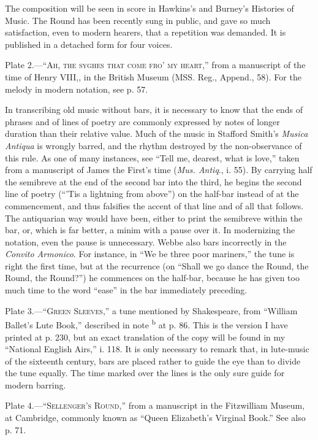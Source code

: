 The composition will be seen in score in Hawkins’s and Burney’s Histories of
Music. The Round has been recently sung in public, and gave so much satisfaction,
even to modern hearers, that a repetition was demanded. It is published in a detached
form for four voices.

\bigskip
Plate 2.—“\textsc{Ah, the syghes that come fro’ my heart},” from a manu\-script of
the time of Henry VIII,, in the British Museum (MSS. Reg., Append., 58). For
the melody in modern notation, see p. 57.
\pagebreak

In transcribing old music without bars, it is necessary to know that the ends of 
phrases and of lines of poetry are commonly expressed by notes of longer duration
than their relative value. Much of the music in Stafford Smith's \textit{Musica Antiqua} is
wrongly barred, and the rhythm destroyed by the non-observance of this rule. As
one of many instances, see “Tell me, dearest, what is love,” taken from a manuscript
of James the First’s time (\textit{Mus. Antiq}., i. 55). By carrying half the semibreve at
the end of the second bar into the third, he begins the second line of poetry (“'Tis
a lightning from above”) on the half-bar instead of at the commencement, and thus
falsifies the accent of that line and of all that follows. The antiquarian way would have
been, either to print the semibreve within the bar, or, which is far better, a minim with
a pause over it. In modernizing the notation, even the pause is unnecessary. Webbe
also bars incorrectly in the \textit{Convito Armonico}. For instance, in “We be three poor
mariners,” the tune is right the first time, but at the recurrence (on “Shall we go
dance the Round, the Round, the Round?”) he commences on the half-bar, because
he has given too much time to the word “ease” in the bar immediately preceding.

\smallskip
Plate 3.—“\textsc{Green Sleeves},” a tune mentioned by Shakespeare, from “Will\-iam
Ballet’s Lute Book,” described in note \textsuperscript{b} at p. 86. This is the version I have printed
at p. 230, but an exact translation of the copy will be found in my “National English
Airs,” i. 118. It is only necessary to remark that, in lute-music of the sixteenth
century, bars are placed rather to guide the eye than to divide the tune equally. The
time marked over the lines is the only sure guide for modern barring.

\smallskip
Plate 4.—“\textsc{Sellenger’s Round},” from a manuscript in the Fitzwilliam Museum,
at Cambridge, commonly known as “Queen Elizabeth’s Virginal Book.” See also
p. 71.


